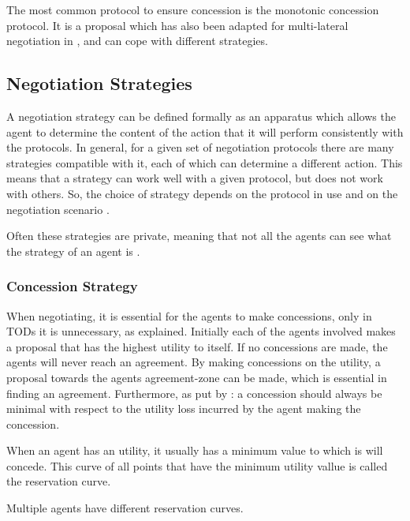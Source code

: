 The most common protocol to ensure concession is the monotonic concession protocol. It is a proposal which has also been adapted for multi-lateral negotiation in \citep{endriss2006monotonic}, and can cope with different strategies.

\subsection{Negotiation Strategies}
A negotiation strategy can be defined formally as an apparatus which allows the agent to determine the content of the action that it will perform consistently with the protocols. In general, for a given set of negotiation protocols there are many strategies compatible with it, each of which can determine a different action. This means that a strategy can work well with a given protocol, but does not work with others. So, the choice of strategy depends on the protocol in use and on the negotiation scenario \citep{di2015multi}.

Often these strategies are private, meaning that not all the agents can see what the strategy of an agent is \citep{fatima2004agenda}. 

\subsubsection{Concession Strategy}
\label{sec:concessionstrat}
When negotiating, it is essential for the agents to make concessions, only in TODs it is unnecessary, as explained. Initially each of the agents involved makes a proposal that has the highest utility to itself. If no concessions are made, the agents will never reach an agreement. By making concessions on the utility, a proposal towards the agents agreement-zone can be made, which is essential in finding an agreement. Furthermore, as put by \citet{endriss2006monotonic}: a concession should always be minimal with respect to the utility loss incurred by the agent making the concession.

\begin{definition*}
	When an agent has an utility, it usually has a minimum value to which is will concede. This curve of all points that have the minimum utility vallue is called the reservation curve. 
	
	Multiple agents have different reservation curves.
		
\end{definition*}

